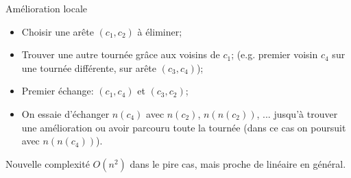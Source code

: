 \documentclass{beamer}
\begin{document}
\begin{frame}
\begin{exampleblock}{Amélioration locale}
\begin{itemize}
\item Choisir une arête $(c_1,c_2)$ à éliminer;
\item Trouver une autre tournée grâce aux voisins de $c_1$; (e.g. premier voisin $c_4$ sur une tournée différente, sur arête $(c_3,c_4)$);
\item Premier échange: $(c_1,c_4)$ et $(c_3,c_2)$;
\item On essaie d'échanger $n(c_4)$ avec $n(c_2)$, $n(n(c_2))$, ... jusqu'à trouver une amélioration ou avoir parcouru toute la tournée (dans ce cas on poursuit avec $n(n(c_4))$).
\end{itemize}
\end{exampleblock}

\begin{alertblock}{Nouvelle complexité}
$O(n^2)$ dans le pire cas, mais proche de linéaire en général.
\end{alertblock}
\end{frame}
\end{document}
